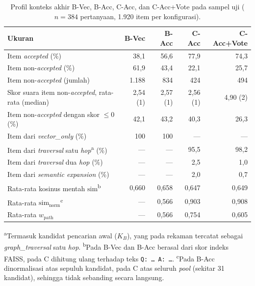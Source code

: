 \begin{table}[!htbp]
\centering
\small
\caption{Profil konteks akhir B-Vec, B-Acc, C-Acc, dan C-Acc+Vote pada sampel uji ($n{=}384$ pertanyaan, 1.920 item per konfigurasi).}
\label{tab:profil-retrieval}
\renewcommand{\arraystretch}{1.2}
\begin{tabular}{|l|r|r|r|r|}
\hline
\textbf{Ukuran} & \textbf{B-Vec} & \textbf{B-Acc} & \textbf{C-Acc} & \textbf{C-Acc+Vote} \\
\hline
Item \emph{accepted} (\%) & 38,1 & 56,6 & 77,9 & 74,3 \\
Item non-\emph{accepted} (\%) & 61,9 & 43,4 & 22,1 & 25,7 \\
Item non-\emph{accepted} (jumlah) & 1.188 & 834 & 424 & 494 \\
Skor suara item non-\emph{accepted}, rata-rata (median) & 2,54 (1) & 2,57 (1) & 2,56 (1) & 4,90 (2) \\
Item non-\emph{accepted} dengan skor $\leq 0$ (\%) & 42,1 & 43,2 & 40,3 & 26,3 \\
Item dari \emph{vector\_only} (\%) & 100 & 100 & --- & --- \\
Item dari \emph{traversal} satu \emph{hop}\textsuperscript{a} (\%) & --- & --- & 95,5 & 98,2 \\
Item dari \emph{traversal} dua \emph{hop} (\%) & --- & --- & 2,5 & 1,0 \\
Item dari \emph{semantic expansion} (\%) & --- & --- & 2,0 & 0,7 \\
Rata-rata kosinus mentah $\mathrm{sim}$\textsuperscript{b} & 0,660 & 0,658 & 0,647 & 0,649 \\
Rata-rata $\mathrm{sim}_{\mathrm{norm}}$\textsuperscript{c} & --- & 0,566 & 0,903 & 0,908 \\
Rata-rata $w_{\mathrm{path}}$ & --- & 0,566 & 0,754 & 0,605 \\
\hline
\end{tabular}

\vspace{0.1cm}
\raggedright\footnotesize
\textsuperscript{a}Termasuk kandidat pencarian awal ($K_B$), yang pada rekaman tercatat sebagai \emph{graph\_traversal} satu \emph{hop}.
\textsuperscript{b}Pada B-Vec dan B-Acc berasal dari skor indeks FAISS, pada C dihitung ulang terhadap teks \texttt{Q: \ldots\ A: \ldots}.
\textsuperscript{c}Pada B-Acc dinormalisasi atas sepuluh kandidat, pada C atas seluruh \emph{pool} (sekitar 31 kandidat), sehingga tidak sebanding secara langsung.
\end{table}

